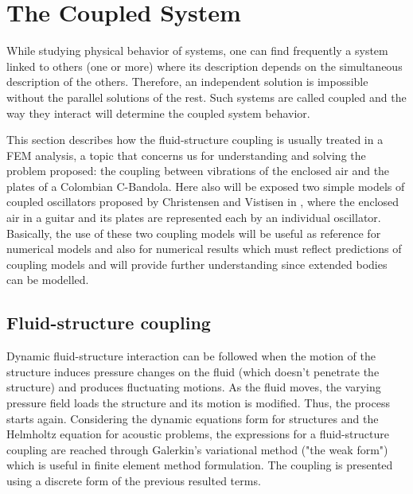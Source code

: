 \section{The Coupled System}

While studying physical behavior of systems, one can find frequently a system linked to others (one or more) where its description depends on the simultaneous description of the others. Therefore, an independent solution is impossible without the parallel solutions of the rest. Such systems are called coupled and the way they interact will determine the coupled system behavior.

This section describes how the fluid-structure coupling is usually treated in a FEM analysis, a topic that concerns us for understanding and solving the problem proposed: the coupling between vibrations of the enclosed air and the plates of a Colombian C-Bandola. Here also will be exposed two simple models of coupled oscillators proposed by Christensen and Vistisen in \cite{Christensen, Christensen3}, where the enclosed air in a guitar and its plates are represented each by an individual oscillator. Basically, the use of these two coupling models will be useful as reference for numerical models and also for numerical results which must reflect predictions of coupling models and will provide further understanding since extended bodies can be modelled.

\subsection{Fluid-structure coupling}

Dynamic fluid-structure interaction can be followed when the motion of the structure induces pressure changes on the fluid (which doesn't penetrate the structure) and produces fluctuating motions. As the fluid moves, the varying pressure field loads the structure and its motion is modified. Thus, the process starts again. Considering the dynamic equations form for structures and the Helmholtz equation for acoustic problems, the expressions for a fluid-structure coupling are reached through Galerkin's variational method ("the weak form") which is useful in finite element method formulation. The coupling is presented using a discrete form of the previous resulted terms.

